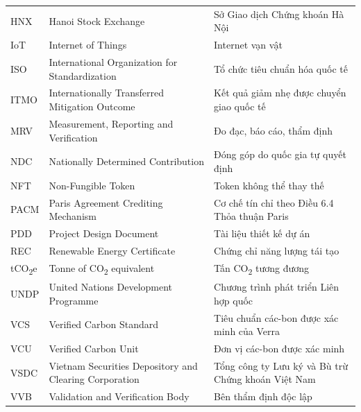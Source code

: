 \documentclass[a4paper,oneside]{report}
\begin{document}
\begin{longtable}{@{}p{2.4cm}p{5.4cm}p{6.3cm}@{}}
HNX    & Hanoi Stock Exchange                      & Sở Giao dịch Chứng khoán Hà Nội \\
IoT    & Internet of Things                        & Internet vạn vật \\
ISO    & International Organization for Standardization & Tổ chức tiêu chuẩn hóa quốc tế \\
ITMO   & Internationally Transferred Mitigation Outcome & Kết quả giảm nhẹ được chuyển giao quốc tế \\
MRV    & Measurement, Reporting and Verification   & Đo đạc, báo cáo, thẩm định \\
NDC    & Nationally Determined Contribution        & Đóng góp do quốc gia tự quyết định \\
NFT    & Non-Fungible Token                        & Token không thể thay thế \\
PACM   & Paris Agreement Crediting Mechanism       & Cơ chế tín chỉ theo Điều 6.4 Thỏa thuận Paris \\
PDD    & Project Design Document                   & Tài liệu thiết kế dự án \\
REC    & Renewable Energy Certificate              & Chứng chỉ năng lượng tái tạo \\
tCO\textsubscript{2}e & Tonne of CO\textsubscript{2} equivalent & Tấn CO\textsubscript{2} tương đương \\
UNDP   & United Nations Development Programme      & Chương trình phát triển Liên hợp quốc \\
VCS    & Verified Carbon Standard                  & Tiêu chuẩn các-bon được xác minh của Verra \\
VCU    & Verified Carbon Unit                      & Đơn vị các-bon được xác minh \\
VSDC   & Vietnam Securities Depository and Clearing Corporation & Tổng công ty Lưu ký và Bù trừ Chứng khoán Việt Nam \\
VVB    & Validation and Verification Body          & Bên thẩm định độc lập \\
\end{longtable}
\end{document}
